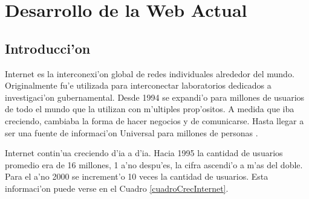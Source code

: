 \chapter{Desarrollo de la Web Actual}
\label{desarrolloWeb}
\section{Introducci'on}

Internet es la interconexi'on global de redes individuales alrededor del mundo. Originalmente fu'e utilizada para interconectar laboratorios dedicados a investigaci'on gubernamental. Desde 1994 se expandi'o para millones de usuarios de todo el mundo que la utilizan con m'ultiples prop'ositos. A medida que iba creciendo, cambiaba la forma de hacer negocios y de comunicarse. Hasta llegar a ser una fuente de informaci'on Universal para millones de personas \citep{iws}.

Internet contin'ua creciendo d'ia a d'ia. Hacia 1995 la cantidad de usuarios promedio era de 16 millones, 1 a'no despu'es, la cifra ascendi'o a m'as del doble. Para el a'no 2000 se increment'o 10 veces la cantidad de usuarios. Esta informaci'on puede verse en el Cuadro \ref{cuadroCrecInternet}.

